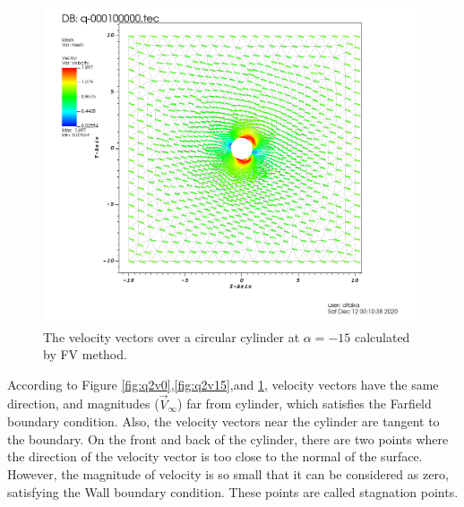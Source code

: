 \documentclass[letterpaper,12pt]{article}
\begin{document}
\begin{figure} [ht]
	\centering
	\includegraphics[height = 9.5cm]{graph/neg15deg/Cylinder_neg15angle_vector0000.png}
	\caption{The velocity vectors over a circular cylinder at $\alpha=-15$ calculated by FV method.}
    \label{fig:q2v-15}
\end{figure}

\vspace{1cm}

According to Figure \ref{fig:q2v0},\ref{fig:q2v15},and \ref{fig:q2v-15}, velocity vectors 
have the same direction, and magnitudes ($\vec{V}_{\infty}$) far from cylinder, which 
satisfies the Farfield boundary condition. Also, the velocity vectors near the cylinder are tangent
to the boundary. On the front and back of the cylinder, there are two points where the direction
of the velocity vector is too close to the normal of the surface. However, the magnitude of velocity is
so small that it can be considered as zero, satisfying the Wall boundary condition. These points
are called stagnation points.

\newpage
\end{document}
